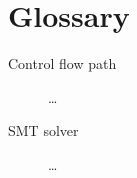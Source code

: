 
\section{Glossary}
\label{se:glossary}

\begin{description}
\item [Control flow path]  \ldots
\item [SMT solver]  \ldots
\end{description}
